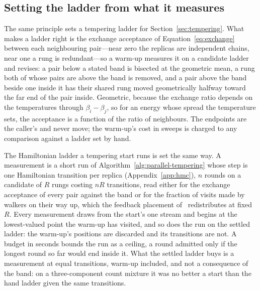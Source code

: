 \documentclass[11pt,a4paper]{article}
\begin{document}
\subsection{Setting the ladder from what it measures}
\label{app:tempering:ladder}
The same principle sets a tempering ladder for Section~\ref{sec:tempering}. What
makes a ladder right is the exchange acceptance of Equation~\ref{eq:exchange}
between each neighbouring pair---near zero the replicas are independent chains,
near one a rung is redundant---so a warm-up measures it on a candidate ladder
and revises: a pair below a stated band is bisected at the geometric mean, a
rung both of whose pairs are above the band is removed, and a pair above the
band beside one inside it has their shared rung moved geometrically halfway
toward the far end of the pair inside. Geometric, because the exchange ratio
depends on the temperatures through $\beta_i - \beta_j$, so for an energy whose
spread the temperature sets, the acceptance is a function of the ratio of
neighbours. The endpoints are the caller's and never move; the warm-up's cost
in sweeps is charged to any comparison against a ladder set by hand.

The Hamiltonian ladder a tempering start runs is set the same way. A
measurement is a short run of Algorithm~\ref{alg:parallel-tempering} whose
step is one Hamiltonian transition per replica (Appendix~\ref{app:hmc}), $n$
rounds on a candidate of $R$ rungs costing $nR$ transitions, read either for
the exchange acceptance of every pair against the band or for the fraction of
visits made by walkers on their way up, which the feedback placement
of~\citet{katzgraber2006} redistributes at fixed $R$. Every measurement
draws from the start's one stream and begins at the lowest-valued point the
warm-up has visited, and so does the run on the settled ladder: the warm-up's
positions are discarded and its transitions are not. A budget
in seconds bounds the run as a ceiling, a round admitted only if the longest
round so far would end inside it. What the settled ladder buys is a
measurement at equal transitions, warm-up included, and not a consequence of
the band: on a three-component count mixture it was no better a start than
the hand ladder given the same transitions.
\end{document}

